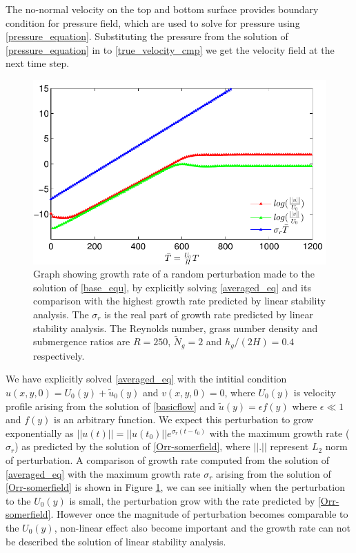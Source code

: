 \documentclass[12pt]{report}   %
\newcommand{\Ndg}{\tilde{N}_g}
\begin{document}
The no-normal velocity on the top and bottom surface provides boundary condition for pressure field, which are used to solve for pressure using \eqref{pressure_equation}. Substituting the pressure from the solution of \eqref{pressure_equation} in to \eqref{true_velocity_cmp} we get the velocity field at the next time step. 
\begin{figure}
\centerline{\includegraphics{LinearStabilityVsCFD1} }
\caption{Graph showing growth rate of a random perturbation made to the solution of \eqref{base_equ}, by explicitly solving \eqref{averaged_eq} and its comparison with the highest growth rate predicted by linear stability analysis. The $\sigma_r$ is the real part of growth rate predicted by linear stability analysis. The  Reynolds number, grass number density and submergence ratios are $R=250$, $\Ndg=2$ and $h_{g}/(2H) = 0.4$ respectively.}
\label{CFD_vs_LinearStabilityGrowthRate}
\end{figure}

We have explicitly solved \eqref{averaged_eq} with the intitial condition $u(x,y,0) = U_{0}(y)+\tilde{u}_0(y)$ and $v(x,y,0)=0$, where $U_{0}(y)$ is velocity profile arising from the solution of \eqref{basicflow} and $\tilde{u}(y) = \epsilon f(y)$ where $\epsilon \ll 1$ and $f(y)$ is an arbitrary function. We expect this perturbation to grow exponentially as $||u(t)|| = ||u(t_0)|| e^{\sigma_r (t-t_0)}$ with the maximum growth rate ($\sigma_r$) as predicted by the solution of \eqref{Orr-somerfield}, where $||.||$ represent $L_2$ norm of perturbation. A comparison of growth rate computed from the solution of \eqref{averaged_eq} with the
maximum growth rate $\sigma_r$ arising from the solution of \eqref{Orr-somerfield} is shown in Figure \ref{CFD_vs_LinearStabilityGrowthRate}, we can see initially when the perturbation to the $U_0(y)$ is small, the perturbation grow with the rate predicted by \eqref{Orr-somerfield}. However once the magnitude of perturbation becomes comparable to the $U_0(y)$, non-linear effect also become important and the growth rate can not be described the solution of linear stability analysis. 
\end{document}

